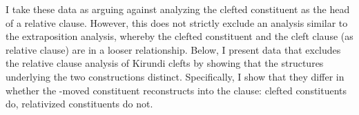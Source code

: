 \documentclass[12pt]{article}
\begin{document}

%


I take these data as arguing against analyzing the clefted constituent as the head of a relative clause. However, this does not strictly exclude an analysis similar to the extraposition analysis, whereby the clefted constituent and the cleft clause (as relative clause) are in a looser relationship. Below, I present data that excludes the relative clause analysis of Kirundi clefts by showing that the structures underlying the two constructions distinct. Specifically, I show that they differ in whether the \abar{}-moved constituent reconstructs into the clause: clefted constituents do, relativized constituents do not. 
\end{document}
